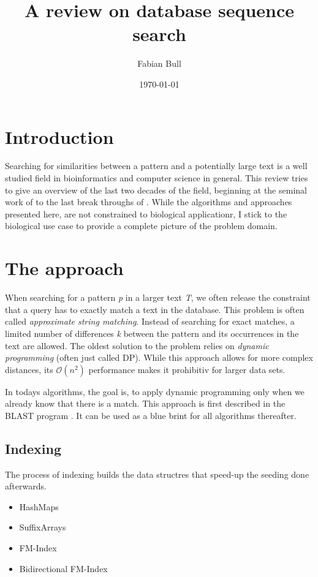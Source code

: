 \documentclass[12pt]{article}
\title{A review on database sequence search}
\author{Fabian Bull}
\date{\today}
\begin{document}
\maketitle

\section{Introduction}
\label{sec:introduction}

Searching for similarities between a pattern and a potentially large text is a well studied field in bioinformatics and computer science in general.
This review tries to give an overview of the last two decades of the field, beginning at the seminal work of \cite{Altschul1990} to the last break throughs of \cite{Buchfink2015}.
While the algorithms and approaches presented here, are not constrained to biological applicationr, I stick to the biological use case to provide a complete picture of the problem domain.

\section{The approach}
\label{sec:approach}

When searching for a pattern \emph{p} in a larger text \emph{T}, we often release the constraint that a query has to exactly match a text in the database.
This problem is often called \emph{approximate string matching}. 
Instead of searching for exact matches, a limited number of differences \emph{k} between the pattern and its occurrences in the text are allowed.
The oldest solution \cite{Sellers1980} to the problem relies on \emph{dynamic programming} (often just called DP). 
While this approach allows for more complex distances, its $\mathcal{O}(n^2)$ performance makes it prohibitiv for larger data sets.

In todays algorithms, the goal is, to apply dynamic programming only when we already know that there is a match.
This approach is first described in the BLAST program \cite{Altschul1990}.
It can be used as a blue brint for all algorithms thereafter.

\subsection{Indexing}
\label{subsec:indexing}

The process of indexing builds the data structres that speed-up the seeding done afterwards.

\begin{itemize}
    \item HashMaps
    \item SuffixArrays \cite{Burkhardt1999}
    \item FM-Index
    \item Bidirectional FM-Index \cite{Buchfink2015}
\end{itemize}
\end{document}
